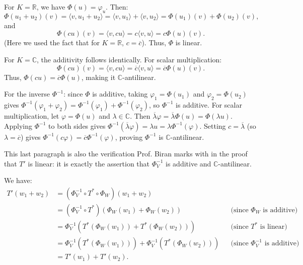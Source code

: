 \begin{exercisesolution}
\label{sol:dual_space_inner_product_isomorphism}
For $K = \mathbb{R}$, we have $\Phi(u) = \varphi_u$. Then:
\[
    \Phi(u_1+u_2)(v) = \langle v, u_1+u_2 \rangle = \langle v, u_1 \rangle + \langle v, u_2 \rangle = \Phi(u_1)(v) + \Phi(u_2)(v),
\]
and
\[
    \Phi(c u)(v) = \langle v, c u \rangle = c \langle v, u \rangle = c \Phi(u)(v).
\]
(Here we used the fact that for $K = \mathbb{R}$, $c = \overline{c}$). Thus, $\Phi$ is linear.

For $K = \mathbb{C}$, the additivity follows identically. For scalar multiplication:
\[
    \Phi(c u)(v) = \langle v, c u \rangle = \overline{c} \langle v, u \rangle = \overline{c} \Phi(u)(v).
\]
Thus, $\Phi(c u) = \overline{c} \Phi(u)$, making it $\mathbb{C}$-antilinear.

For the inverse $\Phi^{-1}$: since $\Phi$ is additive, taking $\varphi_1 = \Phi(u_1)$ and $\varphi_2 = \Phi(u_2)$ gives $\Phi^{-1}(\varphi_1 + \varphi_2) = \Phi^{-1}(\varphi_1) + \Phi^{-1}(\varphi_2)$, so $\Phi^{-1}$ is additive.
For scalar multiplication, let $\varphi = \Phi(u)$ and $\lambda \in \mathbb{C}$. Then $\overline{\lambda} \varphi = \overline{\lambda} \Phi(u) = \Phi(\lambda u)$. Applying $\Phi^{-1}$ to both sides gives $\Phi^{-1}(\overline{\lambda} \varphi) = \lambda u = \lambda \Phi^{-1}(\varphi)$. Setting $c = \overline{\lambda}$ (so $\lambda = \overline{c}$) gives $\Phi^{-1}(c \varphi) = \overline{c} \Phi^{-1}(\varphi)$, proving $\Phi^{-1}$ is $\mathbb{C}$-antilinear.

This last paragraph is also the verification Prof. Biran marks with  in the proof that $T'$ is linear: it is exactly the assertion that $\Phi_V^{-1}$ is additive and $\mathbb{C}$-antilinear.
\end{exercisesolution}

\begin{exercisesolution}
\label{sol:additivity_T_prime}
We have:
\begin{align*}
    T'(w_1 + w_2) &= (\Phi_V^{-1} \circ T^* \circ \Phi_W)(w_1 + w_2) \\
    &= (\Phi_V^{-1} \circ T^*)(\Phi_W(w_1) + \Phi_W(w_2)) && \text{(since $\Phi_W$ is additive)} \\
    &= \Phi_V^{-1}(T^*(\Phi_W(w_1)) + T^*(\Phi_W(w_2))) && \text{(since $T^*$ is linear)} \\
    &= \Phi_V^{-1}(T^*(\Phi_W(w_1))) + \Phi_V^{-1}(T^*(\Phi_W(w_2))) && \text{(since $\Phi_V^{-1}$ is additive)} \\
    &= T'(w_1) + T'(w_2).
\end{align*}
\end{exercisesolution}

